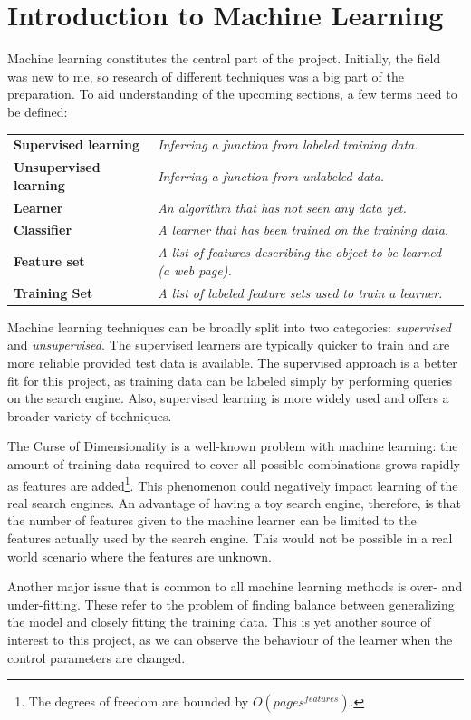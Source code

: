 \documentclass[12pt,a4paper,notitlepage,twoside]{scrbook}
\begin{document}
\section{Introduction to Machine Learning}

Machine learning constitutes the central part of the project. Initially, the field was new
to me, so research of different techniques was a big part of the preparation.
To aid understanding of the upcoming sections, a few terms need to be defined:

\begin{tabular}{l l}
	\bf Supervised learning & \it Inferring a function from labeled training data. \\
	\bf Unsupervised learning & \it Inferring a function from unlabeled data.\\
	\bf Learner & \it An algorithm that has not seen any data yet.\\
	\bf Classifier & \it A learner that has been trained on the training data.\\
	\bf Feature set & \it A list of features describing the object to be learned (a web
	page).\\
	\bf Training Set & \it A list of labeled feature sets used to train a learner.\\
\end{tabular}

Machine learning techniques can be broadly split into two categories: \textit{supervised}
and \textit{unsupervised}. The supervised learners are typically quicker to train and are
more reliable provided test data is available. The supervised approach is a better fit for
this project, as training data can be labeled simply by performing queries on the search
engine. Also, supervised learning is more widely used and offers a broader variety of
techniques.

The Curse of Dimensionality is a well-known problem with machine learning: the amount of
training data required to cover all possible combinations grows rapidly as features are
added\footnote{The degrees of freedom are bounded by \(O(pages^{features})\).}. This
phenomenon could negatively impact learning of the real search engines.  An advantage of
having a toy search engine, therefore, is that the number of features given to the machine
learner can be limited to the features actually used by the search engine. This would not
be possible in a real world scenario where the features are unknown.

Another major issue that is common to all machine learning methods is over- and
under-fitting. These refer to the problem of finding balance between generalizing the
model and closely fitting the training data. This is yet another source of interest to
this project, as we can observe the behaviour of the learner when the control
parameters are changed.
\end{document}
